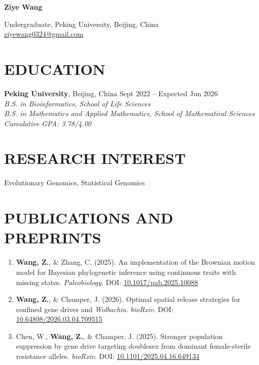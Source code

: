 \documentclass[a4paper,10pt]{extarticle}
\begin{document}
\pagestyle{fancy}
\renewcommand{\headrulewidth}{0pt}
\fancyhead{}
\thispagestyle{empty} %

\begin{center}
    \textbf{\LARGE Ziye Wang}
    \vspace{3pt} 

    Undergraduate, Peking University, Beijing, China \\ 
    \href{mailto:ziyewang0324@gmail.com}{ziyewang0324@gmail.com} 
\end{center}

\section*{EDUCATION}
\noindent
\textbf{Peking University}, Beijing, China \hfill Sept 2022 -- Expected Jun 2026\\
\textit{B.S. in Bioinformatics, School of Life Sciences} \\
\textit{B.S. in Mathematics and Applied Mathematics, School of Mathematical Sciences} 
\\
\mbox{} \hfill \textit{Cumulative GPA: 3.78/4.00}

\section*{RESEARCH INTEREST}
Evolutionary Genomics, Statistical Genomics

\section*{PUBLICATIONS AND PREPRINTS}
\begin{enumerate}
\item \textbf{Wang, Z.}, \& Zhang, C. (2025). An implementation of the Brownian motion model for Bayesian phylogenetic inference using continuous traits with missing states. \textit{Paleobiology}. DOI: \href{https://doi.org/10.1017/pab.2025.10088}{10.1017/pab.2025.10088}    
\vspace{5pt} 

\item \textbf{Wang, Z.}, \& Champer, J. (2026). Optimal spatial release strategies for confined gene drives and \textit{Wolbachia}. \textit{bioRxiv}. DOI: \href{https://doi.org/10.64898/2026.03.04.709515}{10.64898/2026.03.04.709515}
\vspace{5pt}

\item Chen, W., \textbf{Wang, Z.}, \& Champer, J. (2025). Stronger population suppression by gene drive targeting doublesex from dominant female-sterile resistance alleles. \textit{bioRxiv}. DOI: \href{https://doi.org/10.1101/2025.04.16.649134}{10.1101/2025.04.16.649134}
\end{enumerate}
\end{document}
